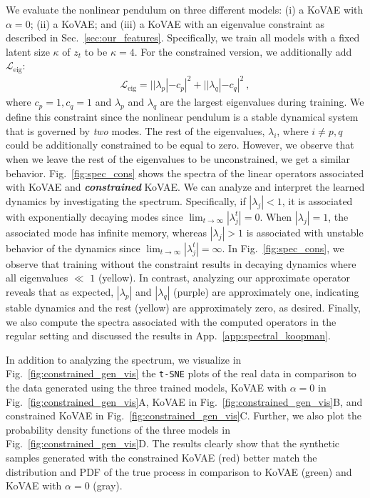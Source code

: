 \documentclass{article} %
\newcommand{\code}[1]{\texttt{#1}}
\begin{document}
We evaluate the nonlinear pendulum on three different models: (i) a KoVAE with $\alpha=0$; (ii) a KoVAE; and (iii) a KoVAE with an eigenvalue constraint as described in Sec.~\ref{sec:our_features}. Specifically, we train all models with a fixed latent size $\kappa$ of $z_t$ to be $\kappa = 4$. For the constrained version, we additionally add $\mathcal{L}_\text{eig}$:
\begin{align}
    \mathcal{L}_\text{eig} =  | |\lambda_p| - c_p |^2 + | |\lambda_q| - c_q |^2 \ ,
\end{align}
where $c_p = 1, c_q = 1$ and $\lambda_p$ and $\lambda_q$ are the largest eigenvalues during training. We define this constraint since the nonlinear pendulum is a stable dynamical system that is governed by \emph{two} modes. The rest of the eigenvalues, $\lambda_i$, where $i \neq p,q$ could be additionally constrained to be equal to zero. However, we observe that when we leave the rest of the eigenvalues to be unconstrained, we get a similar behavior. Fig.~\ref{fig:spec_cons} shows the spectra of the linear operators associated with KoVAE and \textbf{\textit{constrained}} KoVAE. We can analyze and interpret the learned dynamics by investigating the spectrum. Specifically, if $|\lambda_j | < 1$, it is associated with exponentially decaying modes since $\lim_{t \rightarrow \infty} | \lambda_j^t | = 0$. When $|\lambda_j | = 1$, the associated mode has infinite memory, whereas $|\lambda_j | > 1$ is associated with unstable behavior of the dynamics since $\lim_{t \rightarrow \infty} | \lambda_j^t | = \infty$. In Fig.~\ref{fig:spec_cons}, we observe that training without the constraint results in decaying dynamics where all eigenvalues \(\ll\) $1$ (yellow). In contrast, analyzing our approximate operator reveals that as expected, $|\lambda_p|$ and $|\lambda_q|$ (purple) are approximately one, indicating stable dynamics and the rest (yellow) are approximately zero, as desired. Finally, we also compute the spectra associated with the computed operators in the regular setting and discussed the results in App.~\ref{app:spectral_koopman}.

In addition to analyzing the spectrum, we visualize in Fig.~\ref{fig:constrained_gen_vis} the \code{t-SNE} plots of the real data in comparison to the data generated using the three trained models, KoVAE with $\alpha = 0$ in Fig.~\ref{fig:constrained_gen_vis}A, KoVAE in Fig.~\ref{fig:constrained_gen_vis}B, and constrained KoVAE in Fig.~\ref{fig:constrained_gen_vis}C. Further, we also plot the probability density functions of the three models in Fig.~\ref{fig:constrained_gen_vis}D. The results clearly show that the synthetic samples generated with the constrained KoVAE (red) better match the distribution and PDF of the true process in comparison to KoVAE (green) and KoVAE with $\alpha = 0$ (gray).
\end{document}

